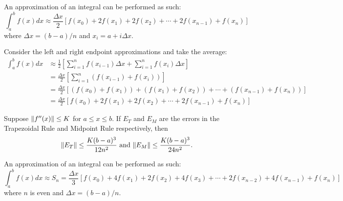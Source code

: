 \documentclass[a4paper,11pt]{article}
\begin{document}
\begin{outline}
    An approximation of an integral can be performed as such:
    \[
      \int_a^bf(x)dx \approx \frac{\Delta{x}}{2}\left[f(x_0)+2f(x_1)+2f(x_2)+\cdots+2f(x_{n-1})+f(x_n)\right]
    \]
    where \(\Delta{x} = (b-a)/n\) and \(x_i = a + i\Delta{x}\).
    
    \begin{justification}
      Consider the left and right endpoint approximations and take the average:
      \begin{align*}
        \int_a^bf(x)dx &\approx \frac{1}{2}\left[\sum_{i=1}^nf(x_{i-1})\Delta{x} + \sum_{i=1}^nf(x_i)\Delta{x}\right] \\
                       &= \frac{\Delta{x}}{2}\left[\sum_{i=1}^n (f(x_{i-1})+f(x_i))\right] \\
                       &= \frac{\Delta{x}}{2}\left[(f(x_0)+f(x_1)) + (f(x_1)+f(x_2)) + \cdots + (f(x_{n-1})+f(x_n))\right] \\
                       &= \frac{\Delta{x}}{2}\left[f(x_0)+2f(x_1)+2f(x_2)+\cdots+2f(x_{n-1})+f(x_n)\right]
      \end{align*}
    \end{justification}
    
    Suppose \(\|f''(x)\| \leq K\) for \(a \leq x \leq b\). If \(E_T\) and \(E_M\) are the errors in the 
    Trapezoidal Rule and Midpoint Rule respectively, then \[ \|E_T\| \leq \frac{K(b-a)^3}{12n^2}\text{ and }
    \|E_M\| \leq \frac{K(b-a)^3}{24n^2}\text{.} \]
    
    An approximation of an integral can be performed as such:
    \[
      \int_a^bf(x)dx \approx S_n = \frac{\Delta{x}}{3}\left[f(x_0) + 4f(x_1) + 2f(x_2) + 4f(x_3) + \cdots +
                                   2f(x_{n-2}) + 4f(x_{n-1}) + f(x_n)\right]
    \]
    where \(n\) is even and \(\Delta{x} = (b-a)/n\).
    

\end{outline}
\end{document}
